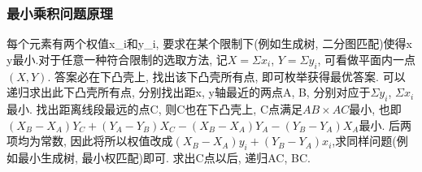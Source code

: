 \subsubsection{最小乘积问题原理}
\noindent
每个元素有两个权值{x_i}和{y_i}, 要求在某个限制下(例如生成树, 二分图匹配)使得{\Sigma x \Sigma y}最小.对于任意一种符合限制的选取方法, 记$X=\Sigma x_i$, $Y=\Sigma y_i$, 可看做平面内一点$(X,Y)$. 答案必在下凸壳上, 找出该下凸壳所有点, 即可枚举获得最优答案. 可以递归求出此下凸壳所有点, 分别找出距x, y轴最近的两点A, B, 分别对应于$\Sigma y_i$, $\Sigma x_i$最小. 找出距离线段最远的点C, 则C也在下凸壳上, C点满足$AB\times AC$最小, 也即$(X_B-X_A)Y_C + (Y_A-Y_B)X_C - (X_B-X_A)Y_A - (Y_B-Y_A)X_A$最小. 后两项均为常数, 因此将所以权值改成$(X_B-X_A)y_i+(Y_B-Y_A)x_i$,求同样问题(例如最小生成树, 最小权匹配)即可. 求出C点以后, 递归AC, BC.
